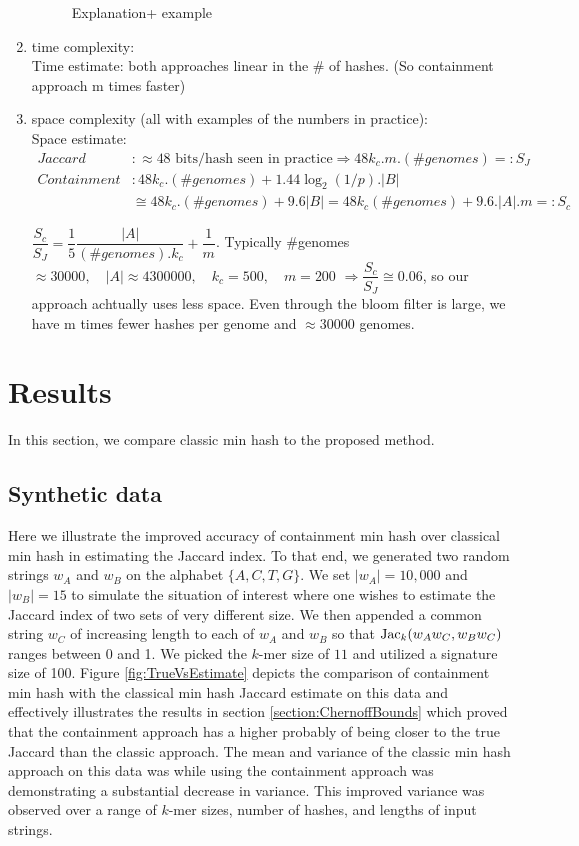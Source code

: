 \documentclass[11pt]{amsart}
\theoremstyle{remark}
\numberwithin{equation}{section}
\newcommand{\themethod}{containment min hash }
\DeclareMathOperator{\Jac}{{\rm Jac}}
\newcommand{\SyntheticDataClassic}{\protect }
\newcommand{\SyntheticDataContainment}{\protect }
\begin{document}
\begin{enumerate}
\begin{figure}[!h]
\begin{center}
\end{center}
\caption{Explanation+ example }
\label{fig:DeltaK}%
\end{figure}
\item time complexity:\\
Time estimate: both approaches linear in the \# of hashes. (So containment approach m times faster)
\item space complexity (all with examples of the numbers in practice):\\
Space estimate:
\begin{align*}
Jaccard &: \approx 48 \text{ bits/hash seen in practice}  \Rightarrow 48 k_c.m.(\#genomes)=: S_J\\
Containment &:  48 k_c.(\#genomes)+1.44\log_2(1/p).|B| \\
&\cong 48 k_c.(\#genomes)+9.6|B| = 48 k_c(\#genomes)+ 9.6. |A|.m=: S_c
\end{align*}

$\dfrac{S_c}{S_J}=\dfrac{1}{5}\dfrac{|A|}{(\#genomes).k_c}+\dfrac{1}{m}$.
  Typically \#genomes $\approx 30000, \quad |A|\approx 4300000, \quad k_c=500, \quad m= 200$ 
$\Rightarrow \dfrac{S_c}{S_J}\cong0.06$, so our approach achtually uses less space. Even through the bloom filter is large, we have m times fewer hashes per genome and $\approx 30000 $ genomes.
\end{enumerate}


\section{Results}
In this section, we compare classic min hash to the proposed method.
\subsection{Synthetic data}
\label{section:SyntheticData}
Here we illustrate the improved accuracy of \themethod over classical min hash in estimating the Jaccard index. To that end, we generated two random strings $w_A$ and $w_B$ on the alphabet $\{A,C,T,G\}$. We set $|w_A|= 10,000$ and $|w_B| = 15$ to simulate the situation of interest where one wishes to estimate the Jaccard index of two sets of very different size. We then appended a common string $w_C$ of increasing length to each of $w_A$ and $w_B$ so that $\Jac_k(w_Aw_C, w_Bw_C)$ ranges between 0 and 1. We picked the $k$-mer size of $11$ and utilized a signature size of 100. Figure \ref{fig:TrueVsEstimate} depicts the comparison of \themethod with the classical min hash Jaccard estimate on this data and effectively illustrates the results in section \ref{section:ChernoffBounds} which proved that the containment approach has a higher probably of being closer to the true Jaccard than the classic approach. The mean and variance of the classic min hash approach on this data was \SyntheticDataClassic while using the containment approach was \SyntheticDataContainment demonstrating a substantial decrease in variance. This improved variance was observed over a range of $k$-mer sizes, number of hashes, and lengths of input strings.
\end{document}
